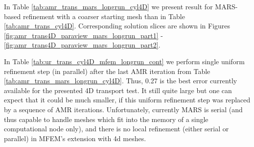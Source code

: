 \documentclass[a4paper,12pt]{amsart}
\numberwithin{equation}{section}
\renewcommand{\div}{\operatorname{div}}
\def\bsigma{{\boldsymbol \sigma}}
\begin{document}

In Table \ref{tab:amr_trans_mars_longrun_cyl4D} we present result for MARS-based refinement with a coarser starting mesh than in Table \ref{tab:amr_trans_cyl4D}. Corresponding solution slices are shown in Figures \ref{fig:amr_trans4D_paraview_mars_longrun_part1} - \ref{fig:amr_trans4D_paraview_mars_longrun_part2}.

In Table \ref{tab:ur_trans_cyl4D_mfem_longrun_cont} we perform single uniform refinement step (in parallel) after the last AMR iteration from Table \ref{tab:amr_trans_mars_longrun_cyl4D}. Thus, 0.27 is the best error currently available for the presented 4D transport test. It still quite large but one can expect that it could be much smaller, if this uniform refinement step was replaced by a sequence of AMR iterations. Unfortunately, currently MARS is serial (and thus capable to handle meshes which fit into the memory of a single computational node only), and there is no local refinement (either serial or parallel) in MFEM's extension with 4d meshes.
\end{document}
